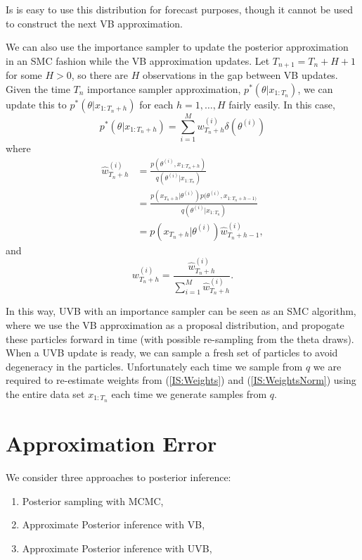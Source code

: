 \documentclass[12pt,a4paper]{article}\usepackage[]{graphicx}\usepackage[]{color}
\begin{document}
Is is easy to use this distribution for forecast purposes, though it cannot be used to construct the next VB approximation.

We can also use the importance sampler to update the posterior approximation in an SMC fashion while the VB approximation updates. Let $T_{n+1} = T_{n} + H + 1$ for some $H > 0$, so there are $H$ observations in the gap between VB updates.
\\

Given the time $T_n$ importance sampler approximation, $p^*(\theta | x_{1:T_n})$, we can update this to $p^*(\theta | x_{1:T_n+h})$ for each $h = 1, \dots, H$ fairly easily. In this case,
\begin{equation}
\label{IS:ApproxUpdate}
p^*(\theta | x_{1:T_n+h}) = \sum_{i=1}^M w^{(i)}_{T_n+h} \delta(\theta^{(i)})
\end{equation}
where
\begin{align}
\hat{w}^{(i)}_{T_n+h} &= \frac{p(\theta^{(i)}, x_{1:T_n+h})}{q(\theta^{(i)} | x_{1:T_n})} \nonumber \\
&= \frac{p(x_{T_n+h} | \theta^{(i)})p(\theta^{(i)}, x_{1:T_n+h-1)}}{q(\theta^{(i)} | x_{1:T_n})} \nonumber \\
&= p(x_{T_n+h} | \theta^{(i)}) \hat{w}^{(i)}_{T_n+h-1}, \label{IS:UpdateWeights}
\end{align}
and
\begin{equation}
\label{IS:UpdateWeightsNorma}
w^{(i)}_{T_n+h} = \frac{\hat{w}^{(i)}_{T_n+h}}{\sum_{i=1}^M \hat{w}^{(i)}_{T_n+h}}.
\end{equation}

In this way, UVB with an importance sampler can be seen as an SMC algorithm, where we use the VB approximation as a proposal distribution, and propogate these particles forward in time (with possible re-sampling from the theta draws). When a UVB update is ready, we can sample a fresh set of particles to avoid degeneracy in the particles. Unfortunately each time we sample from $q$ we are required to re-estimate weights from (\ref{IS:Weights}) and (\ref{IS:WeightsNorm}) using the entire data set $x_{1:T_n}$ each time we generate samples from $q$. 
\\




\section{Approximation Error}

We consider three approaches to posterior inference:
\begin{enumerate}
\item Posterior sampling with MCMC,
\item Approximate Posterior inference with VB,
\item Approximate Posterior inference with UVB,
\end{enumerate}
\end{document}
